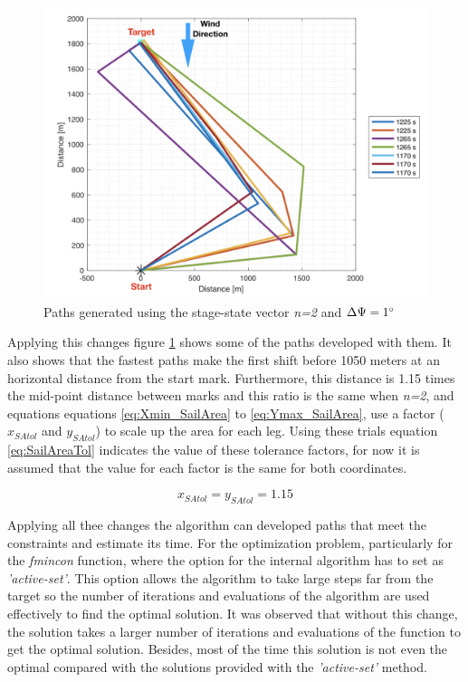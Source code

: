 \begin{figure}[hbt!]
    \centering
    \includegraphics[width=0.45 \linewidth]{sections/n_stage_state_v.png}
    \caption{Paths generated using the stage-state vector \textit{n=2} and $\Delta \Psi =1\degree$}
    \label{fig:n_stage_state_vector_paths}
\end{figure}
Applying this changes figure \ref{fig:n_stage_state_vector_paths} shows some of the paths developed with them. It also shows that the fastest paths make the first shift before 1050 meters at an horizontal distance from the start mark. Furthermore, this distance is 1.15 times the mid-point distance between marks and this ratio is the same when \textit{n=2}, and equations equations \ref{eq:Xmin_SailArea} to \ref{eq:Ymax_SailArea}, use a factor ($x_{SAtol}$ and  $y_{SAtol}$) to scale up the area for each leg. Using these trials  %
equation \ref{eq:SailAreaTol} indicates the value of these tolerance factors, for now it is assumed that the value for each factor is the same for both coordinates. \par

\begin{equation} \label{eq:SailAreaTol}
    x_{SAtol}=y_{SAtol}=1.15
\end{equation}

Applying all thee changes the algorithm can developed paths that meet the constraints and estimate its time. For the optimization problem, particularly for the \textit{fmincon} function, where the option for the internal algorithm has to set as \textit{'active-set'}. This option allows the algorithm to take large steps far from the target so the number of iterations and evaluations of the algorithm are used effectively to find the optimal solution. It was observed that without this change, the solution takes a larger number of iterations and evaluations of the function to get the optimal solution. Besides, most of the time this solution is not even the optimal compared with the solutions provided with the \textit{'active-set'} method. \par 


